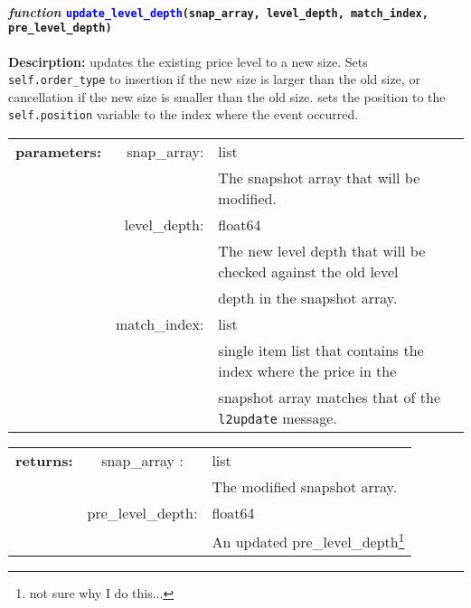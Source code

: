 \paragraph{\textit{function} \textcolor{blue}{\texttt{update\_level\_depth}}\texttt{(snap\_array, level\_depth, match\_index, pre\_level\_depth)}}
\hfill \break
\textbf{Descirption:} updates the existing price level to a new size. Sets \texttt{self.order\_type} to insertion if the new size is larger than the old size, or cancellation if the new size is smaller than the old size. sets the position to the \texttt{self.position} variable to the index where the event occurred.

\begin{tabular}{r r l }
	\textbf{parameters:}	& snap\_array: & list\\
	&  & The snapshot array that will be modified.\\
	& level\_depth:& float64\\
	&& The new level depth that will be checked against the old level \\
	&&  depth in the snapshot array.\\
	& match\_index:& list\\
	&& single item list that contains the index where the price in the\\
	&& snapshot array matches that of the \texttt{l2update} message. 
\end{tabular}

\begin{tabular}{l c l}
	\textbf{returns:} & snap\_array : & list\\
	&& The modified snapshot array.\\
	& pre\_level\_depth:& float64\\
	&& An updated pre\_level\_depth\footnote{not sure why I do this...}  
\end{tabular}

